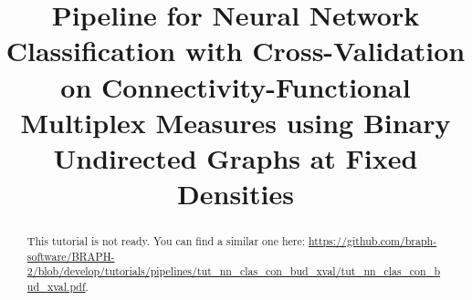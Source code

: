 \documentclass[justified]{tufte-handout}
\title[Classification Cross-Validation Connectivity-Functional Multiplex BUD Measure]{Pipeline for Neural Network Classification with Cross-Validation on Connectivity-Functional Multiplex Measures using Binary Undirected Graphs at Fixed Densities}
\begin{document}
\maketitle

\begin{abstract}
\noindent
This tutorial is not ready. You can find a similar one here: \url{https://github.com/braph-software/BRAPH-2/blob/develop/tutorials/pipelines/tut_nn_clas_con_bud_xval/tut_nn_clas_con_bud_xval.pdf}.
\end{abstract}
\end{document}
